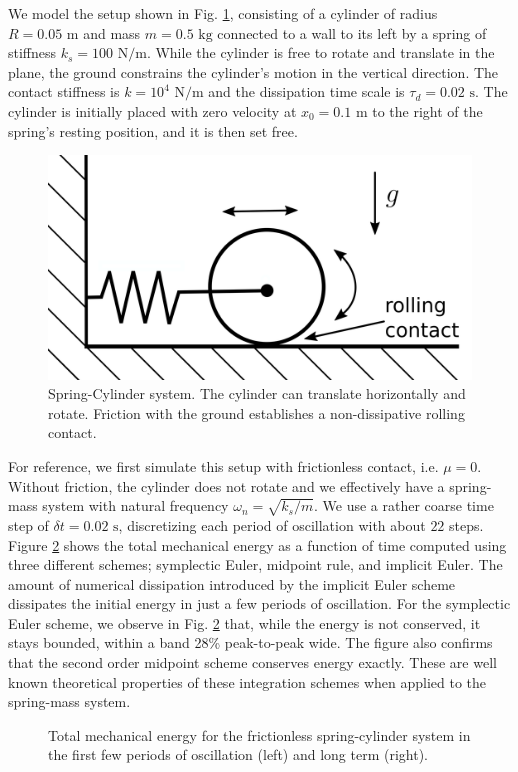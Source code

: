 We model the setup shown in Fig. \ref{fig:spring_cylinder}, consisting of a
cylinder of radius $R=0.05\text{ m}$ and mass $m=0.5\text{ kg}$ connected to a
wall to its left by a spring of stiffness $k_s=100\text{ N}/\text{m}$. While the
cylinder is free to rotate and translate in the plane, the ground constrains the
cylinder's motion in the vertical direction. The contact stiffness is
$k=10^{4}\text{ N}/\text{m}$ and the dissipation time scale is
$\tau_d=0.02\text{ s}$. The cylinder is initially placed with zero velocity at
$x_0=0.1\text{ m}$ to the right of the spring's resting position, and it is then
set free.
\begin{figure}[!h]
	\centering
	\includegraphics[width=0.6\columnwidth]{figures/schematics/spring_cylinder.png}
	\caption{\label{fig:spring_cylinder} 
	Spring-Cylinder system. The cylinder can translate horizontally and rotate.
	Friction with the ground establishes a non-dissipative rolling contact.}
\end{figure}

For reference, we first simulate this setup with frictionless contact, i.e.
$\mu=0$. Without friction, the cylinder does not rotate and we effectively have
a spring-mass system with natural frequency $\omega_n=\sqrt{k_s/m}$. We use a
rather coarse time step of $\delta t=0.02\text{ s}$, discretizing each period of
oscillation with about $22$ steps. Figure
\ref{fig:frictionless_spring_cylinder_energy} shows the total mechanical energy
as a function of time computed using three different schemes; symplectic Euler,
midpoint rule, and implicit Euler. The amount of numerical dissipation
introduced by the implicit Euler scheme dissipates the initial energy in just a
few periods of oscillation. For the symplectic Euler scheme, we observe in Fig.
\ref{fig:frictionless_spring_cylinder_energy} that, while the energy is not
conserved, it stays bounded, within a band 28\% peak-to-peak wide. The figure
also confirms that the second order midpoint scheme conserves energy exactly.
These are well known theoretical properties of these integration schemes when
applied to the spring-mass system.
\begin{figure}[!h]
    \centering
    \caption{\label{fig:frictionless_spring_cylinder_energy} 
    Total mechanical energy for the frictionless spring-cylinder system in the
    first few periods of oscillation (left) and long term (right).}
\end{figure}

